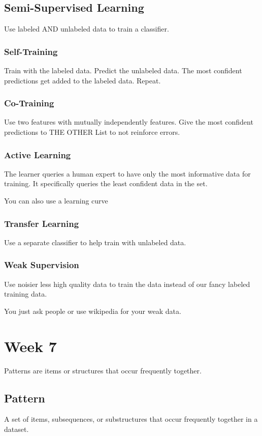 \documentclass[fleqn]{report}
\begin{document}
\section{Semi-Supervised Learning}
Use labeled AND unlabeled data to train a classifier.

\subsection{Self-Training}
Train with the labeled data. Predict the unlabeled data. The most confident 
predictions get added to the labeled data. Repeat.

\subsection{Co-Training}
Use two features with mutually independently features. Give the 
most confident predictions to THE OTHER List to not reinforce errors.

\subsection{Active Learning}
The learner queries a human expert to have only the most informative data 
for training. It specifically queries the least confident data in the set.

You can also use a learning curve 

\subsection{Transfer Learning}
Use a separate classifier to help train with unlabeled data.

\subsection{Weak Supervision}
Use noisier less high quality data to train the data instead of our fancy 
labeled training data.

You just ask people or use wikipedia for your weak data.

\chapter{Week 7}
Patterns are items or structures that occur frequently together. 

\section{Pattern}
A set of items, subsequences, or substructures that 
occur frequently together in a dataset. 
\end{document}
